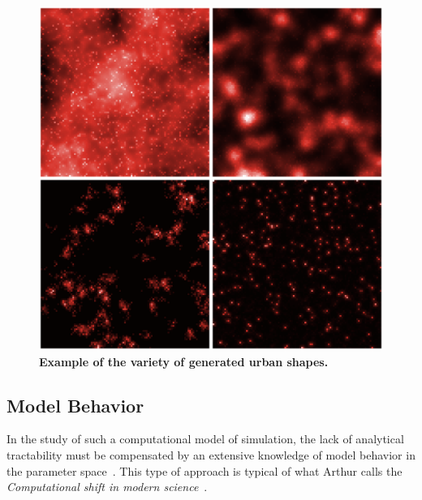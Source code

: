 \documentclass[10pt,letterpaper,draft]{article}
\begin{document}
\begin{figure}
\includegraphics[width=\textwidth]{figures/Fig2.png}
\caption{\textbf{Example of the variety of generated urban shapes.}}
\label{fig:fig2}
\end{figure}




\subsection*{Model Behavior}



In the study of such a computational model of simulation, the lack of analytical tractability must be compensated by an extensive knowledge of model behavior in the parameter space~\cite{banos2013pour}. This type of approach is typical of what Arthur calls the \emph{Computational shift in modern science}~\cite{arthur2015complexity}.
\end{document}
